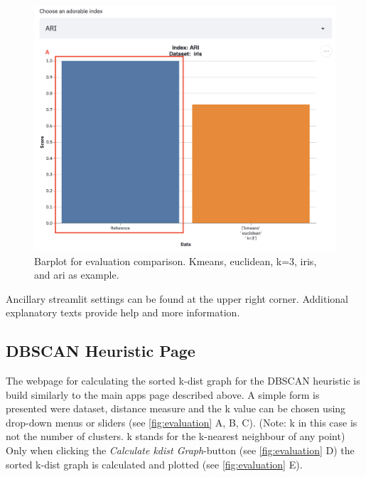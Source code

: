 \begin{figure}[H]
	\centering
	\includegraphics[width=\linewidth]{modules/web_frontend/eval_bar.png}
	\caption{Barplot for evaluation comparison. Kmeans, euclidean, k=3, iris, and \acrshort{ari} as example.}\label{fig:eval_bar}
\end{figure}

Ancillary streamlit settings can be found at the upper right corner. Additional explanatory texts provide help and more information. \\


\subsection{DBSCAN Heuristic Page} \label{heuristicmanual}
The webpage for calculating the sorted k-dist graph for the DBSCAN heuristic is build similarly to the main apps page described above.
A simple form is presented were dataset, distance measure and the k value can be chosen using drop-down menus or sliders (see \autoref{fig:evaluation} A, B, C). (Note: k in this case is not the number of clusters. k stands for the k-nearest neighbour of any point)
Only when clicking the \textit{Calculate kdist Graph}-button (see \autoref{fig:evaluation} D) the sorted k-dist graph is calculated and plotted (see \autoref{fig:evaluation} E).

